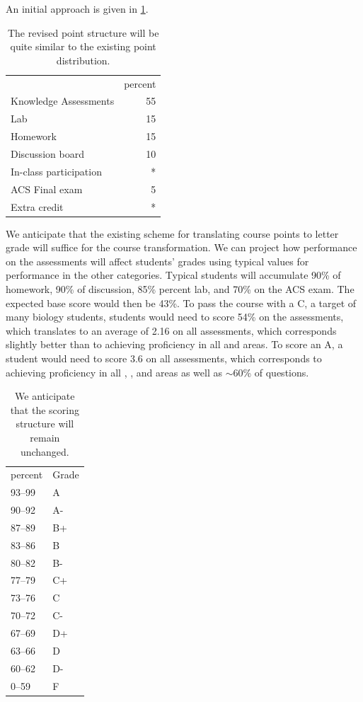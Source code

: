 \documentclass[10pt,letterpaper]{article}
\begin{document}
An initial approach is given in \cref{tbl:grading_scheme_mockup}.
\begin{table}
\begin{tabular}{lr}
&percent\\
Knowledge Assessments & 55\\
Lab  & 15\\
Homework  & 15\\
Discussion board  & 10\\
In-class participation  & *\\ 
ACS Final exam  & 5\\
Extra credit  & *
\end{tabular}
\caption{\label{tbl:grading_scheme_mockup}
The revised point structure will be quite similar to the existing point distribution.} 
\end{table}

We anticipate that the existing scheme for translating course points to letter grade will suffice for the course transformation. We can project how performance on the assessments will affect students' grades using typical values for performance in the other categories. Typical students will accumulate 90\% of homework, 90\% of discussion, 85\% percent lab, and 70\% on the ACS exam. The expected base score would then be 43\%. To pass the course with a C, a target of many biology students, students would need to score  54\% on the assessments, which translates to an average of 2.16 on all assessments, which corresponds slightly better than to achieving proficiency in all \recall and \comprehension areas. To score an A, a student would need to score 3.6 on all assessments, which corresponds to achieving proficiency in all \recall, \comprehension, and \analysis areas as well as $\sim60$\% of \use questions. 

\begin{table}
\begin{tabular}{ll}
percent&Grade\\
93--99&A\\
90--92&A-\\
87--89&B+\\
83--86&B\\
80--82&B-\\
77--79&C+\\
73--76&C\\
70--72&C-\\
67--69&D+\\
63--66&D\\
60--62&D-\\
0--59&F
\end{tabular}
\caption{\label{tbl:points}
We anticipate that the scoring structure will remain unchanged.} 
\end{table}
\end{document}
